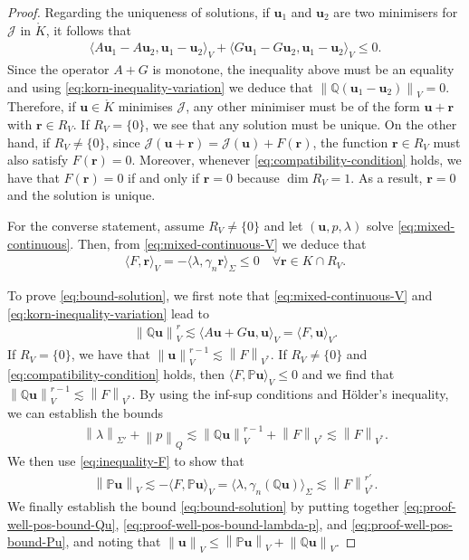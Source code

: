 \documentclass[onefignum,onetabnum]{siamart190516}
\newcommand{\br}{\boldsymbol{r}}
\newcommand{\bu}{\boldsymbol{u}}
\newcommand{\bbP}{\mathbb{P}}
\newcommand{\bbQ}{\mathbb{Q}}
\newcommand{\nrm}[1]{\left\lVert#1\right\rVert}
\newcommand{\Ko}{\mathring{K}}
\newcommand{\Jc}{\mathcal{J}}
\begin{document}
\begin{proof}
	Regarding the uniqueness of solutions, if $\bu_1$ and $\bu_2$ are two minimisers for $\Jc$ in $\Ko$, it follows that 
	\begin{align*}
		\langle A\bu_1 - A\bu_2, \bu_1 - \bu_2 \rangle_V + \langle G\bu_1 - G\bu_2, \bu_1 - \bu_2 \rangle_V \leq 0.
	\end{align*}
	Since the operator $A + G$ is monotone, the inequality above must be an equality and using \eqref{eq:korn-inequality-variation} we deduce that $\nrm{\bbQ(\bu_1 - \bu_2)}_V = 0$. Therefore, if $\bu\in \Ko$ minimises $\Jc$, any other minimiser must be of the form $\bu + \br$ with $\br\in R_V$. If $R_V = \{0\}$, we see that any solution must be unique. On the other hand, if $R_V \neq \{0\}$, since $\Jc(\bu + \br) = \Jc(\bu) + F(\br)$, the function $\br\in R_V$ must also satisfy $F(\br) = 0$. Moreover, whenever \eqref{eq:compatibility-condition} holds, we have that $F(\br) = 0$ if and only if $\br = 0$ because $\dim{R_V}=1$. As a result, $\br = 0$ and the solution is unique.
	
	For the converse statement, assume $R_V \neq \{0\}$ and let $(\bu,p,\lambda)$ solve \eqref{eq:mixed-continuous}. Then, from \eqref{eq:mixed-continuous-V} we deduce that 
	\begin{align*}
		\langle F, \br \rangle_V = - \langle \lambda, \gamma_n\br \rangle_\Sigma \leq 0 \quad \forall \br \in K\cap R_V.
	\end{align*}
	
	To prove \eqref{eq:bound-solution}, we first note that \eqref{eq:mixed-continuous-V} and \eqref{eq:korn-inequality-variation} lead to 
	\begin{align}\label{eq:proof-well-pos-bound-Qu}
		\nrm{\bbQ\bu}_V^r \lesssim \langle A\bu + G\bu, \bu \rangle_V = \langle F, \bu \rangle_V.
	\end{align}
	If $R_V = \{ 0 \}$, we have that $\nrm{\bu}_V^{r-1} \lesssim \nrm{F}_{V^\ast}$. If $R_V \neq \{ 0 \}$ and \eqref{eq:compatibility-condition} holds, then $\langle F, \bbP \bu \rangle_V \leq 0$ and we find that $\nrm{\bbQ \bu}_V^{r-1} \lesssim \nrm{F}_{V^\ast}$. By using the inf-sup conditions and H\"older's inequality, we can establish the bounds
	\begin{align}\label{eq:proof-well-pos-bound-lambda-p}
		\nrm{\lambda}_{\Sigma'} + \nrm{p}_Q \lesssim \nrm{\bbQ\bu}_V^{r-1} + \nrm{F}_{V^\ast} \lesssim \nrm{F}_{V^\ast}.
	\end{align}
	We then use \eqref{eq:inequality-F} to show that
	\begin{align}\label{eq:proof-well-pos-bound-Pu}
		\nrm{\bbP\bu}_V\lesssim - \langle F, \bbP\bu\rangle_V = \langle \lambda, \gamma_n(\bbQ\bu) \rangle_\Sigma \lesssim \nrm{F}_{V^\ast}^{r'}.
	\end{align}
	We finally establish the bound \eqref{eq:bound-solution} by putting together \eqref{eq:proof-well-pos-bound-Qu}, \eqref{eq:proof-well-pos-bound-lambda-p}, and \eqref{eq:proof-well-pos-bound-Pu}, and noting that $\nrm{\bu}_V \leq \nrm{\bbP\bu}_V + \nrm{\bbQ\bu}_V$.
\end{proof}
\end{document}
